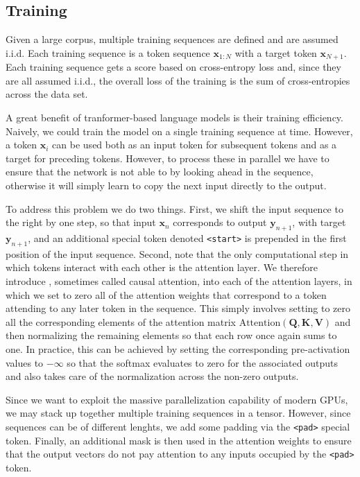 \subsection{Training}
Given a large corpus, multiple training sequences are defined and are assumed i.i.d. Each training sequence is a token sequence \(\mathbf{x}_{1:N}\) with a target token \(\mathbf{x}_{N+1}\).
Each training sequence gets a score based on cross-entropy loss and, since they are all assumed i.i.d., the overall loss of the training is the sum of cross-entropies across the data set.

A great benefit of tranformer-based language models is their training efficiency.
Naively, we could train the model on a single training sequence at time.
However, a token \(\mathbf{x}_i\) can be used both as an input token for subsequent tokens and as a target for preceding tokens.
However, to process these in parallel we have to ensure that the network is not able to  by looking ahead in the sequence, otherwise it will simply learn to copy the next input directly to the output.

To address this problem we do two things. 
First, we shift the input sequence to the right by one step, so that input \(\mathbf{x}_n\) corresponds to output \(\mathbf{y}_{n+1}\), with target \(\mathbf{y}_{n+1}\), and an additional special token denoted \texttt{<start>} is prepended in the first position of the input sequence. 
Second, note that the only computational step in which tokens interact with each other is the attention layer.
We therefore introduce , sometimes called causal attention, into each of the attention layers, in which we set to zero all of the attention weights that correspond to a token attending to any later token in the sequence. 
This simply involves setting to zero all the corresponding elements of the attention matrix \(\text{Attention}(\mathbf{Q}, \mathbf{K}, \mathbf{V})\) and then normalizing the remaining elements so that each row once again sums to one. 
In practice, this can be achieved by setting the corresponding pre-activation values to \(-\infty\) so that the softmax evaluates to zero for the associated outputs and also takes care of the normalization across the non-zero outputs.

Since we want to exploit the massive parallelization capability of modern GPUs, we may stack up together multiple training sequences in a tensor.
However, since sequences can be of different lenghts, we add some padding via the \texttt{<pad>} special token.
Finally, an additional mask is then used in the attention weights to ensure that the output vectors do not pay attention to any inputs occupied by the \texttt{<pad>} token.

